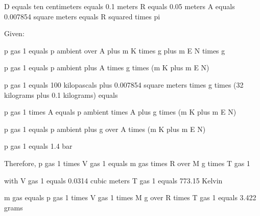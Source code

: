 D equals ten centimeters equals 0.1 meters  
R equals 0.05 meters  
A equals 0.007854 square meters equals R squared times pi  

Given:  

p gas 1 equals p ambient over A plus m K times g plus m E N times g  

p gas 1 equals p ambient plus A times g times (m K plus m E N)  

p gas 1 equals 100 kilopascals plus 0.007854 square meters times g times (32 kilograms plus 0.1 kilograms) equals  

p gas 1 times A equals p ambient times A plus g times (m K plus m E N)  

p gas 1 equals p ambient plus g over A times (m K plus m E N)  

p gas 1 equals 1.4 bar  

Therefore, p gas 1 times V gas 1 equals m gas times R over M g times T gas 1  

with V gas 1 equals 0.0314 cubic meters  
T gas 1 equals 773.15 Kelvin  

m gas equals p gas 1 times V gas 1 times M g over R times T gas 1 equals 3.422 grams